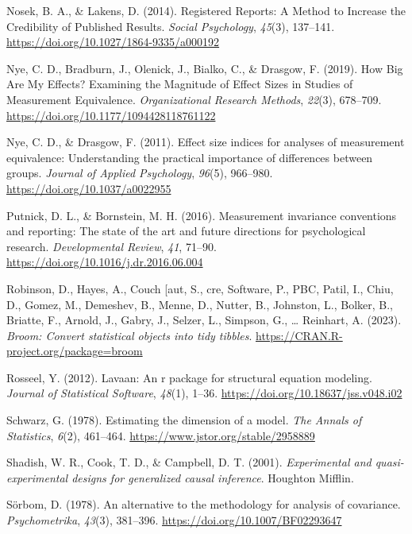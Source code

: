 \documentclass[
  man]{apa7}
\newlength{\cslhangindent}
\newenvironment{CSLReferences}[2] %
 {\begin{list}{}{%
  \setlength{\itemindent}{0pt}
  \setlength{\leftmargin}{0pt}
  \setlength{\parsep}{0pt}
  \ifodd #1
   \setlength{\leftmargin}{\cslhangindent}
   \setlength{\itemindent}{-1\cslhangindent}
  \fi
  \setlength{\itemsep}{#2\baselineskip}}}
 {\end{list}}
\begin{document}
\begin{CSLReferences}{1}{0}
Nosek, B. A., \& Lakens, D. (2014). Registered Reports: A Method to Increase the Credibility of Published Results. \emph{Social Psychology}, \emph{45}(3), 137--141. \url{https://doi.org/10.1027/1864-9335/a000192}

Nye, C. D., Bradburn, J., Olenick, J., Bialko, C., \& Drasgow, F. (2019). How Big Are My Effects? Examining the Magnitude of Effect Sizes in Studies of Measurement Equivalence. \emph{Organizational Research Methods}, \emph{22}(3), 678--709. \url{https://doi.org/10.1177/1094428118761122}

Nye, C. D., \& Drasgow, F. (2011). Effect size indices for analyses of measurement equivalence: Understanding the practical importance of differences between groups. \emph{Journal of Applied Psychology}, \emph{96}(5), 966--980. \url{https://doi.org/10.1037/a0022955}

Putnick, D. L., \& Bornstein, M. H. (2016). Measurement invariance conventions and reporting: The state of the art and future directions for psychological research. \emph{Developmental Review}, \emph{41}, 71--90. \url{https://doi.org/10.1016/j.dr.2016.06.004}

Robinson, D., Hayes, A., Couch {[}aut, S., cre, Software, P., PBC, Patil, I., Chiu, D., Gomez, M., Demeshev, B., Menne, D., Nutter, B., Johnston, L., Bolker, B., Briatte, F., Arnold, J., Gabry, J., Selzer, L., Simpson, G., \ldots{} Reinhart, A. (2023). \emph{Broom: Convert statistical objects into tidy tibbles}. \url{https://CRAN.R-project.org/package=broom}

Rosseel, Y. (2012). Lavaan: An r package for structural equation modeling. \emph{Journal of Statistical Software}, \emph{48}(1), 1--36. \url{https://doi.org/10.18637/jss.v048.i02}

Schwarz, G. (1978). Estimating the dimension of a model. \emph{The Annals of Statistics}, \emph{6}(2), 461--464. \url{https://www.jstor.org/stable/2958889}

Shadish, W. R., Cook, T. D., \& Campbell, D. T. (2001). \emph{Experimental and quasi-experimental designs for generalized causal inference}. Houghton Mifflin.

Sörbom, D. (1978). An alternative to the methodology for analysis of covariance. \emph{Psychometrika}, \emph{43}(3), 381--396. \url{https://doi.org/10.1007/BF02293647}


\end{CSLReferences}
\end{document}
